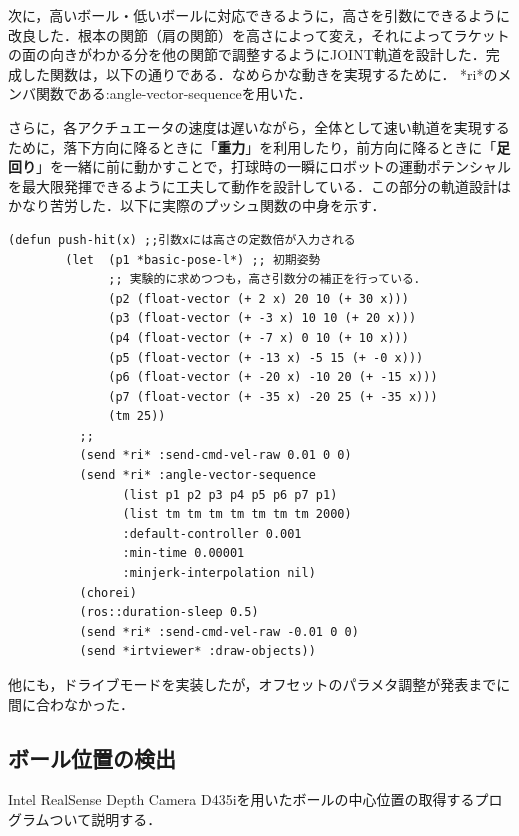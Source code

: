 \documentclass[10pt, oneside, titlepage]{ltjarticle}  %
\begin{document}
    次に，高いボール・低いボールに対応できるように，高さを引数にできるように改良した．根本の関節（肩の関節）を高さによって変え，それによってラケットの面の向きがわかる分を他の関節で調整するようにJOINT軌道を設計した．完成した関数は，以下の通りである．なめらかな動きを実現するために． *ri*のメンバ関数である:angle-vector-sequenceを用いた．

    さらに，各アクチュエータの速度は遅いながら，全体として速い軌道を実現するために，落下方向に降るときに「{\bf 重力}」を利用したり，前方向に降るときに「{\bf 足回り}」を一緒に前に動かすことで，打球時の一瞬にロボットの運動ポテンシャルを最大限発揮できるように工夫して動作を設計している．この部分の軌道設計はかなり苦労した．以下に実際のプッシュ関数の中身を示す．
    \begin{lstlisting}[basicstyle=\ttfamily]
      (defun push-hit(x) ;;引数xには高さの定数倍が入力される
        (let  (p1 *basic-pose-l*) ;; 初期姿勢
              ;; 実験的に求めつつも，高さ引数分の補正を行っている．
              (p2 (float-vector (+ 2 x) 20 10 (+ 30 x)))
              (p3 (float-vector (+ -3 x) 10 10 (+ 20 x)))
              (p4 (float-vector (+ -7 x) 0 10 (+ 10 x)))
              (p5 (float-vector (+ -13 x) -5 15 (+ -0 x)))
              (p6 (float-vector (+ -20 x) -10 20 (+ -15 x)))
              (p7 (float-vector (+ -35 x) -20 25 (+ -35 x)))
              (tm 25))
          ;; 
          (send *ri* :send-cmd-vel-raw 0.01 0 0)
          (send *ri* :angle-vector-sequence 
                (list p1 p2 p3 p4 p5 p6 p7 p1) 
                (list tm tm tm tm tm tm tm 2000)
                :default-controller 0.001
                :min-time 0.00001
                :minjerk-interpolation nil)
          (chorei)
          (ros::duration-sleep 0.5)
          (send *ri* :send-cmd-vel-raw -0.01 0 0)
          (send *irtviewer* :draw-objects))
      \end{lstlisting}
      他にも，ドライブモードを実装したが，オフセットのパラメタ調整が発表までに間に合わなかった．

  \subsection{ボール位置の検出}
  Intel RealSense Depth Camera D435iを用いたボールの中心位置の取得するプログラムついて説明する．
\end{document}
